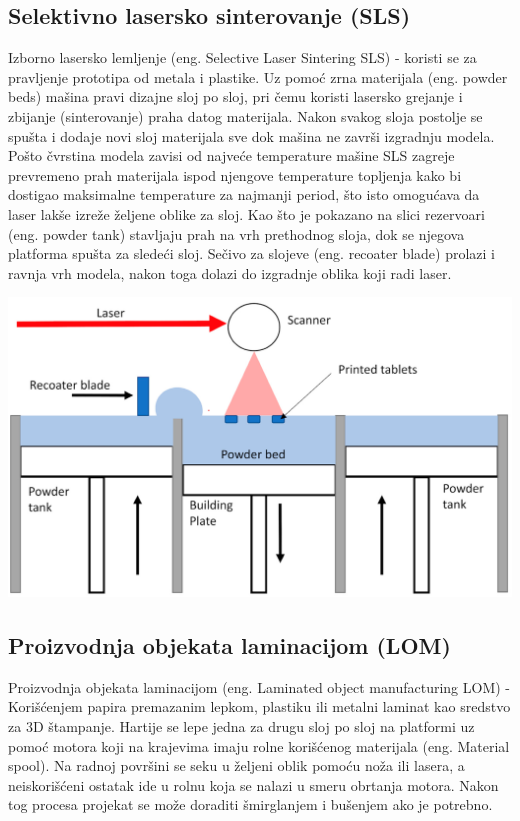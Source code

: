 \documentclass[a4paper]{article}
\begin{document}
{\subsection{Selektivno lasersko sinterovanje (SLS)}
\label{subsec:podnaslov4}
Izborno lasersko lemljenje (eng. Selective Laser Sintering SLS) - koristi se za pravljenje prototipa od metala i plastike. Uz pomoć zrna materijala (eng. powder beds) mašina pravi dizajne sloj po sloj, pri čemu koristi lasersko grejanje i zbijanje (sinterovanje) praha datog materijala. 
\bigbreak Nakon svakog sloja postolje se spušta i dodaje novi sloj materijala sve dok mašina ne završi izgradnju modela. Pošto čvrstina modela zavisi od najveće temperature mašine SLS zagreje prevremeno prah materijala ispod njengove temperature topljenja kako bi dostigao maksimalne temperature za najmanji period, što isto omogućava da laser lakše izreže željene oblike za sloj. 
\bigbreak Kao što je pokazano na slici rezervoari (eng. powder tank) stavljaju prah na vrh prethodnog sloja, dok se njegova platforma spušta za sledeći sloj.
\bigbreak Sečivo za slojeve (eng. recoater blade) prolazi i ravnja vrh modela, nakon toga dolazi do izgradnje oblika koji radi laser. 
\begin{center}
\includegraphics[width=.5\textwidth ]{Tehnikeslike/Sls.png}
\end{center}
\newpage
\subsection{Proizvodnja objekata laminacijom (LOM)}
\label{subsec:podnaslov5}
Proizvodnja objekata laminacijom (eng. Laminated object manufacturing LOM) - Korišćenjem papira premazanim lepkom, plastiku ili metalni laminat kao sredstvo za 3D štampanje. 
\bigbreak Hartije se lepe jedna za drugu sloj po sloj na platformi uz pomoć motora koji na krajevima imaju rolne korišćenog materijala (eng. Material spool).
\bigbreak Na radnoj površini se seku u željeni oblik pomoću noža ili lasera, a neiskorišćeni ostatak ide u rolnu koja se nalazi u smeru obrtanja motora.
\bigbreak Nakon tog procesa projekat se može doraditi šmirglanjem i bušenjem ako je potrebno.

}
\end{document}
